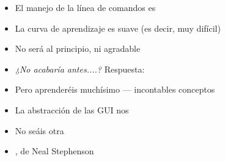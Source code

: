 \documentclass[14pt]{beamer}
\newcommand{\WebLink}[2]{
  \href{#1}{\structure{\PointingHand~\color{sail-green}{#2}}}
}
\begin{document}


\begin{frame}{}
  \begin{block}{}\centering
    \Large {}
  \end{block}
  \begin{itemize}
    \item El manejo de la línea de comandos es 
    \item La curva de aprendizaje es suave (es decir, muy difícil)
    \item No será  al principio, ni agradable
    \item \emph{¿No acabaría antes....?} Respuesta: 
    \item Pero aprenderéis muchísimo — incontables conceptos
    \item La abstracción de las GUI nos 
    \item No seáis otra 
    \item {}, de  Neal Stephenson
  \end{itemize}
\end{frame}
\end{document}
